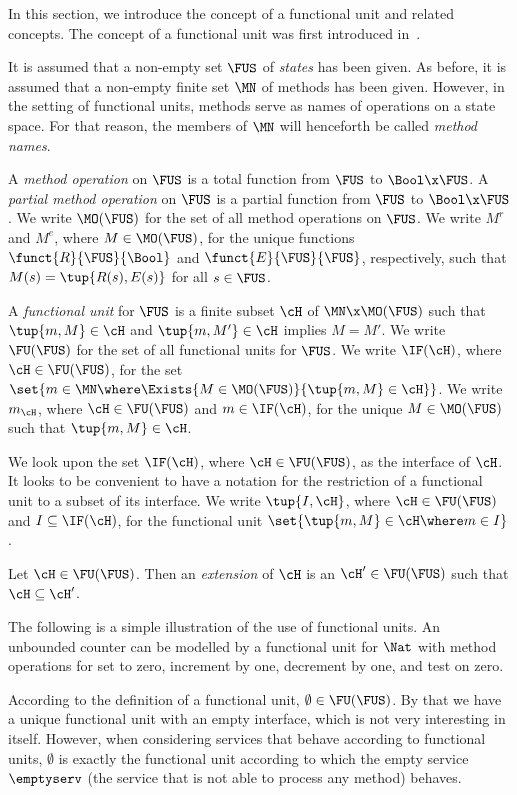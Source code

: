 \documentclass[fleqn]{llncs}
\begin{document}
In this section, we introduce the concept of a functional unit and
related concepts.
The concept of a functional unit was first introduced in~\cite{BM09l}.

It is assumed that a non-empty set $\FUS$ of \emph{states} has been
given.
As before, it is assumed that a non-empty finite set $\MN$ of methods
has been given.
However, in the setting of functional units, methods serve as names of
operations on a state space.
For that reason, the members of $\MN$ will henceforth be called
\emph{method names}.

A \emph{method operation} on $\FUS$ is a total function from $\FUS$ to
$\Bool \x \FUS$.
A \emph{partial method operation} on $\FUS$ is a partial function from
$\FUS$ to $\Bool \x \FUS$.
We write $\MO(\FUS)$ for the set of all method operations on $\FUS$.
We write $M^r$ and $M^e$, where $M \in \MO(\FUS)$, for the unique
functions $\funct{R}{\FUS}{\Bool}$ and $\funct{E}{\FUS}{\FUS}$,
respectively, such that $M(s) = \tup{R(s),E(s)}$ for all $s \in \FUS$.

A \emph{functional unit} for $\FUS$ is a finite subset $\cH$ of
$\MN \x \MO(\FUS)$ such that \mbox{$\tup{m,M} \in \cH$} and
$\tup{m,M'} \in \cH$ implies $M = M'$.
We write $\FU(\FUS)$ for the set of all functional units for $\FUS$.
We write $\IF(\cH)$, where $\cH \in \FU(\FUS)$, for the set
$\set{m \in \MN \where \Exists{M \in \MO(\FUS)}{\tup{m,M} \in \cH}}$.
We write $m_\cH$, where $\cH \in \FU(\FUS)$ and $m \in \IF(\cH)$, for
the unique $M \in \MO(\FUS)$ such that $\tup{m,M} \in \cH$.

We look upon the set $\IF(\cH)$, where $\cH \in \FU(\FUS)$, as the
interface of $\cH$.
It looks to be convenient to have a notation for the restriction of a
functional unit to a subset of its interface.
We write $\tup{I,\cH}$, where $\cH \in \FU(\FUS)$ and
$I \subseteq \IF(\cH)$, for the functional unit
$\set{\tup{m,M} \in \cH \where m \in I}$.

Let $\cH \in \FU(\FUS)$.
Then an \emph{extension} of $\cH$ is an $\cH' \in \FU(\FUS)$ such that
$\cH \subseteq \cH'$.

The following is a simple illustration of the use of functional units.
An unbounded counter can be modelled by a functional unit for $\Nat$
with method operations for set to zero, increment by one, decrement by
one, and test on zero.

According to the definition of a functional unit,
$\emptyset \in \FU(\FUS)$.
By that we have a unique functional unit with an empty interface, which
is not very interesting in itself.
However, when considering services that behave according to functional
units, $\emptyset$ is exactly the functional unit according to which the
empty service $\emptyserv$ (the service that is not able to process any
method) behaves.
\end{document}
